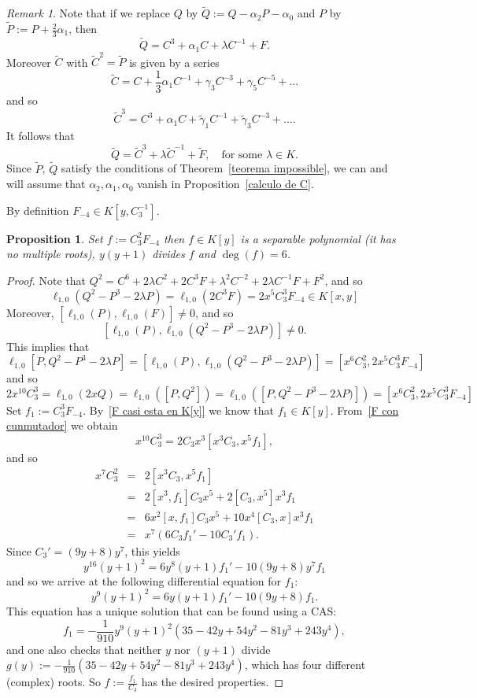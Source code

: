 \documentclass[reqno,a4paper,twoside]{amsart}
\newtheorem{proposition}[theorem]{Proposition}
\theoremstyle{definition}
\theoremstyle{remark}
\newtheorem{remark}[theorem]{Remark}
\begin{document}
\begin{remark}
  Note that if we replace $Q$ by $\tilde Q := Q - \alpha_2 P - \alpha_0$ and $P$ by $\tilde P:= P+\frac 23 \alpha_1$, then
$$
\tilde Q = C^3 +  \alpha_1 C +  \lambda C^{-1} + F.
$$
Moreover $\tilde C$ with $\tilde C^2=\tilde P$ is given by a series
$$
\tilde C=C+\frac 13 \alpha_1 C^{-1}+\gamma_3 C^{-3}+\gamma_5 C^{-5}+\dots
$$
and so
$$
\tilde C^3=C^3+\alpha_1 C+\tilde\gamma_1 C^{-1}+\tilde\gamma_3 C^{-3}+\dots.
$$
It follows that
$$
\tilde Q=\tilde C^3+\lambda \tilde C^{-1}+\tilde F,\quad\text{for some $\lambda\in K$}.
$$
Since  $\tilde P$, $\tilde Q$ satisfy the conditions of Theorem~\ref{teorema impossible}, we can and will assume that $\alpha_2,\alpha_1,\alpha_0$ vanish in Proposition~\ref{calculo de C}.
\end{remark}

By definition $F_{-4}\in K[y,C_3^{-1}]$.

\begin{proposition}
Set $f:=C_3^2 F_{-4}$ then $f\in K[y]$ is a separable polynomial (it has no multiple roots), $y(y+1)$ divides $f$ and $\deg(f)=6$.
\end{proposition}

\begin{proof}
Note that $Q^2=C^6+2\lambda C^2+2C^3 F+\lambda^2 C^{-2}+2\lambda C^{-1}F+F^2$, and so
\begin{equation}\label{F casi esta en K[y]}
  \ell_{1,0}(Q^2-P^3-2\lambda P)=\ell_{1,0}(2C^3 F)=2x^5 C_3^3 F_{-4}\in K[x,y]
\end{equation}
Moreover, $[\ell_{1,0}(P),\ell_{1,0}(F)]\ne 0$, and so
$$
[\ell_{1,0}(P),\ell_{1,0}(Q^2-P^3-2\lambda P)]\ne 0.
$$
This implies that
$$
\ell_{1,0}[P,Q^2-P^3-2\lambda P]=[\ell_{1,0}(P),\ell_{1,0}(Q^2-P^3-2\lambda P)]=[x^6 C_3^2,2x^5 C_3^3 F_{-4}]
$$
and so
\begin{equation}\label{F con cunmutador}
  2x^{10} C_3^3=\ell_{1,0}(2x Q)=\ell_{1,0}([P,Q^2])=\ell_{1,0}([P,Q^2-P^3-2\lambda P)])=[x^6 C_3^2,2x^5 C_3^3 F_{-4}]
\end{equation}
Set $f_1:= C_3^3 F_{-4}$. By~\eqref{F casi esta en K[y]} we know that $f_1\in K[y]$. From~\eqref{F con cunmutador} we obtain
$$
x^{10} C_3^3=2C_3 x^3[x^3 C_3,x^5 f_1],
$$
and so
\begin{eqnarray*}
x^7 C_3^2 &=& 2 [x^3 C_3,x^5 f_1] \\
   &=& 2[x^3,f_1]C_3 x^5+2[C_3,x^5]x^3 f_1 \\
   &=& 6x^2 [x,f_1]C_3 x^5+10x^4[C_3,x]x^3 f_1 \\
   &=& x^7 (6C_3 f_1'-10 C_3' f_1).
\end{eqnarray*}
Since $C_3'=(9y+8)y^7$, this yields
$$
y^{16}(y+1)^2=6y^8(y+1)f_1'-10(9y+8)y^7 f_1
$$
and so we arrive at the following differential equation for $f_1$:
$$
y^9(y+1)^2=6y(y+1)f_1'-10(9y+8) f_1.
$$
This equation has a unique solution that can be found using a CAS:
$$
f_1=-\frac{1}{910}y^9(y+1)^2(35-42y+54 y^2-81 y^3+243 y^4),
$$
and one also checks that neither $y$ nor $(y+1)$ divide $g(y):=-\frac{1}{910}(35-42y+54 y^2-81 y^3+243 y^4)$, which
has four different (complex) roots.
So $f:=\frac{f_1}{C_3}$ has the desired properties.
\end{proof}
\end{document}
